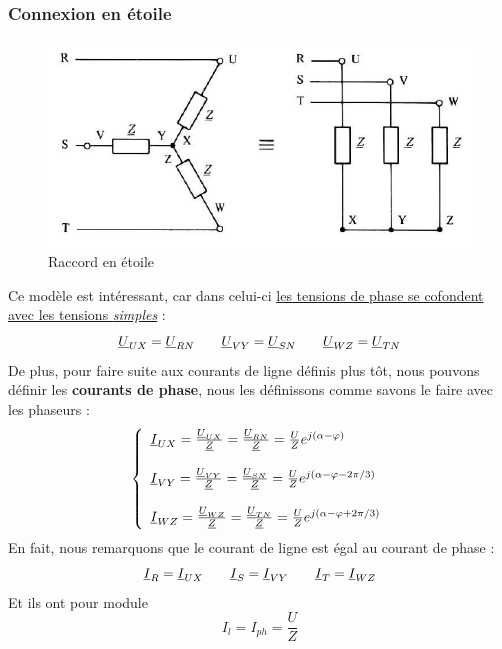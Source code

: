 \documentclass[12pt,a4paper]{article}
\newcommand{\uz}{\uline{Z} }
\newcommand{\ui}{\uline{I} }
\newcommand{\uu}{\uline{U} }
\begin{document}
\subsubsection{Connexion en étoile}
\begin{figure}
	\centering
	\includegraphics[scale=0.5]{images/charge_triphasee_etoile}
	\caption{Raccord en étoile}
	\label{fig: charge triphasee etoile}
\end{figure}
Ce modèle est intéressant, car dans celui-ci \uline{les tensions de phase se cofondent avec les tensions \textit{simples}} :
\begin{equation}
	 \uu_{UX} = \uu_{RN} \qquad \uu_{VY} = \uu_{SN} \qquad \uu_{WZ} = \uu_{TN}	
\end{equation}
De plus, pour faire suite aux courants de ligne définis plus tôt, nous pouvons définir les \textbf{courants de phase}, nous les définissons comme savons le faire avec les phaseurs :
\begin{equation*}
	\left\{\begin{array}{l}
		\ui_{UX} = \frac{\uu_{UX}}{\uz} = \frac{\uu_{RN}}{\uz} = \frac{U}{Z}e^{j(\alpha - \varphi)}\\
		\\		
		\ui_{VY} = \frac{\uu_{VY}}{\uz} = \frac{\uu_{SN}}{\uz} = \frac{U}{Z}e^{j(\alpha - \varphi - 2\pi/3)}\\
		\\		
	\ui_{WZ} = \frac{\uu_{WZ}}{\uz} = \frac{\uu_{TN}}{\uz} = \frac{U}{Z}e^{j(\alpha - \varphi + 2\pi/3)}
\end{array}\right.
\end{equation*}
En fait, nous remarquons que le courant de ligne est égal au courant de phase :
\[\ui_R = \ui_{UX} \qquad \ui_S = \ui_{VY} \qquad \ui_T = \ui_{WZ}\]
Et ils ont pour module
\[I_l = I_{ph} = \frac{U}{Z}\]
\end{document}
